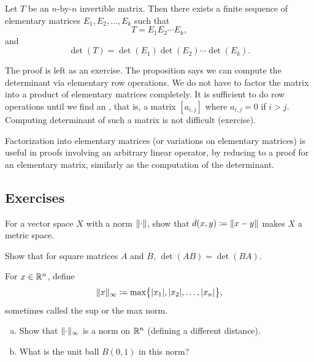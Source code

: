 \begin{prop} \label{prop:elemmatrixdecomp}
Let $T$ be an $n$-by-$n$ invertible matrix.  Then there exists a finite
sequence of elementary matrices $E_1, E_2, \ldots, E_k$ such that
\begin{equation*}
T = E_1 E_2 \cdots E_k ,
\end{equation*}
and
\begin{equation*}
\det(T) = \det(E_1)\det(E_2)\cdots \det(E_k) .
\end{equation*}
\end{prop}

The proof is left as an exercise.
The proposition says we can compute the determinant via elementary row operations.
We do not have to factor the matrix into a product of
elementary matrices completely.  It is sufficient to do row operations
until we find an \emph{}, that is, a matrix
$[a_{i,j}]$ where $a_{i,j} = 0$ if $i > j$.  Computing determinant of such a
matrix is not difficult (exercise).

Factorization into elementary matrices (or variations on elementary
matrices) is useful in proofs involving an arbitrary linear operator, by
reducing to a proof for an elementary matrix, similarly as the computation
of the determinant.


\subsection{Exercises}

\begin{exercise}
For a vector space $X$ with a norm $\lVert {\cdot} \rVert$, show that
$d(x,y) \coloneqq \lVert {x-y} \rVert$ makes $X$ a metric space.
\end{exercise}

\begin{exercise}[Easy]
Show that for square matrices $A$ and $B$, $\det(AB) = \det(BA)$.
\end{exercise}

\begin{exercise}
For $x \in {\mathbb{R}}^n$, define
\begin{equation*}
\lVert {x} \rVert_{\infty} \coloneqq
\max \bigl\{ \lvert {x_1} \rvert, \lvert {x_2} \rvert, \ldots, \lvert {x_n} \rvert \bigr\} ,
\end{equation*}
sometimes called the sup or the max norm.
\begin{enumerate}[a)]
\item
Show that $\lVert {\cdot} \rVert_\infty$ is a norm on ${\mathbb{R}}^n$ (defining a different
distance).
\item
What is the unit ball $B(0,1)$ in this norm?
\end{enumerate}
\end{exercise}

